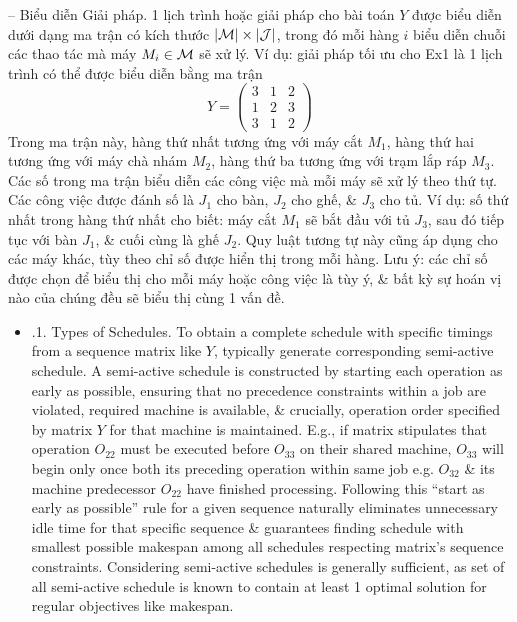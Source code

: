 \documentclass{article}
\begin{document}
\begin{itemize}
\begin{itemize}
        -- {\sf Biểu diễn Giải pháp.} 1 lịch trình hoặc giải pháp cho bài toán $Y$ được biểu diễn dưới dạng ma trận có kích thước $|{\cal M}|\times|{\cal J}|$, trong đó mỗi hàng $i$ biểu diễn chuỗi các thao tác mà máy $M_i\in{\cal M}$ sẽ xử lý. Ví dụ: giải pháp tối ưu cho Ex1 là 1 lịch trình có thể được biểu diễn bằng ma trận
        \begin{equation*}
            Y = \begin{pmatrix}
                3 & 1 & 2\\1 & 2 & 3\\3 & 1 & 2
            \end{pmatrix}
        \end{equation*}
        Trong ma trận này, hàng thứ nhất tương ứng với máy cắt $M_1$, hàng thứ hai tương ứng với máy chà nhám $M_2$, hàng thứ ba tương ứng với trạm lắp ráp $M_3$. Các số trong ma trận biểu diễn các công việc mà mỗi máy sẽ xử lý theo thứ tự. Các công việc được đánh số là $J_1$ cho bàn, $J_2$ cho ghế, \& $J_3$ cho tủ. Ví dụ: số thứ nhất trong hàng thứ nhất cho biết: máy cắt $M_1$ sẽ bắt đầu với tủ $J_3$, sau đó tiếp tục với bàn $J_1$, \& cuối cùng là ghế $J_2$. Quy luật tương tự này cũng áp dụng cho các máy khác, tùy theo chỉ số được hiển thị trong mỗi hàng. Lưu ý: các chỉ số được chọn để biểu thị cho mỗi máy hoặc công việc là tùy ý, \& bất kỳ sự hoán vị nào của chúng đều sẽ biểu thị cùng 1 vấn đề.
        \begin{itemize}
            \item {.1. Types of Schedules.} To obtain a complete schedule with specific timings from a sequence matrix like $Y$, typically generate corresponding semi-active schedule. A semi-active schedule is constructed by starting each operation as early as possible, ensuring that no precedence constraints within a job are violated, required machine is available, \& crucially, operation order specified by matrix $Y$ for that machine is maintained. E.g., if matrix stipulates that operation $O_{22}$ must be executed before $O_{33}$ on their shared machine, $O_{33}$ will begin only once both its preceding operation within same job e.g. $O_{32}$ \& its machine predecessor $O_{22}$ have finished processing. Following this ``start as early as possible'' rule for a given sequence naturally eliminates unnecessary idle time for that specific sequence \& guarantees finding schedule with smallest possible makespan among all schedules respecting matrix's sequence constraints. Considering semi-active schedules is generally sufficient, as set of all semi-active schedule is known to contain at least 1 optimal solution for regular objectives like makespan.


\end{itemize}
\end{itemize}
\end{itemize}
\end{document}
